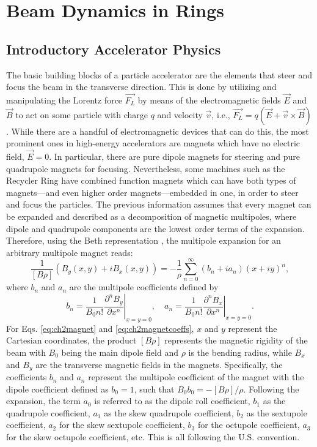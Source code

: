 \chapter{Beam Dynamics in Rings}
\label{sec:ch2}

\section{\label{sec:basic}Introductory Accelerator Physics}
The basic building blocks of a particle accelerator are the elements that steer and focus the beam in the transverse direction. This is done by utilizing and manipulating the Lorentz force $\vec{F_L}$ by means of the electromagnetic fields $\vec{E}$ and $\vec{B}$ to act on some particle with charge $q$ and velocity $\vec{v}$, i.e., $\vec{F_L}=q\left( \vec{E}+\vec{v}\times \vec{B}\right)$. While there are a handful of electromagnetic devices that can do this, the most prominent ones in high-energy accelerators are magnets which have no electric field, $\vec{E}=0$. In particular, there are pure dipole magnets for steering and pure quadrupole magnets for focusing. Nevertheless, some machines such as the Recycler Ring have combined function magnets which can have both types of magnets---and even higher order magnets---embedded in one, in order to steer and focus the particles. The previous information assumes that every magnet can be expanded and described as a decomposition of magnetic multipoles, where dipole and quadrupole components are the lowest order terms of the expansion. Therefore, using the Beth representation \cite{sylee}, the multipole expansion for an arbitrary multipole magnet reads:
\begin{equation}
    \label{eq:ch2magnet}
    \frac{1}{\left[ B \rho \right]}\left(B_y(x,y)+iB_x(x,y) \right)=-\frac{1}{\rho} \sum_{n=0}^{\infty} \left( b_n+i a_n\right) \left( x+i y\right)^n, 
\end{equation}
where $b_n$ and $a_n$ are the multipole coefficients defined by
\begin{equation}
    \label{eq:ch2magnetcoeffs}
    b_n=\frac{1}{B_0 n!} \left. \frac{\partial^n B_y}{\partial x^n} \right| _{x=y=0}, \quad  a_n=\frac{1}{B_0 n!} \left. \frac{\partial^n B_x}{\partial x^n} \right| _{x=y=0}.  
\end{equation}
For Eqs. \ref{eq:ch2magnet} and \ref{eq:ch2magnetcoeffs}, $x$ and $y$ represent the Cartesian coordinates, the product $\left[ B \rho \right]$ represents the magnetic rigidity of the beam with $B_0$ being the main dipole field and $\rho$ is the bending radius, while $B_x$ and $B_y$ are the transverse magnetic fields in the magnets. Specifically, the coefficients $b_n$ and $a_n$ represent the multipole coefficient of the magnet with the dipole coefficient defined as $b_0=1$, such that $B_0b_0=-\left[ B \rho\right]/\rho$. Following the expansion, the term $a_0$ is referred to as the dipole roll coefficient, $b_1$ as the quadrupole coefficient, $a_1$ as the skew quadrupole coefficient, $b_2$ as the sextupole coefficient, $a_2$ for the skew sextupole coefficient, $b_3$ for the octupole coefficient, $a_3$ for the skew octupole coefficient, etc. This is all following the U.S. convention.


